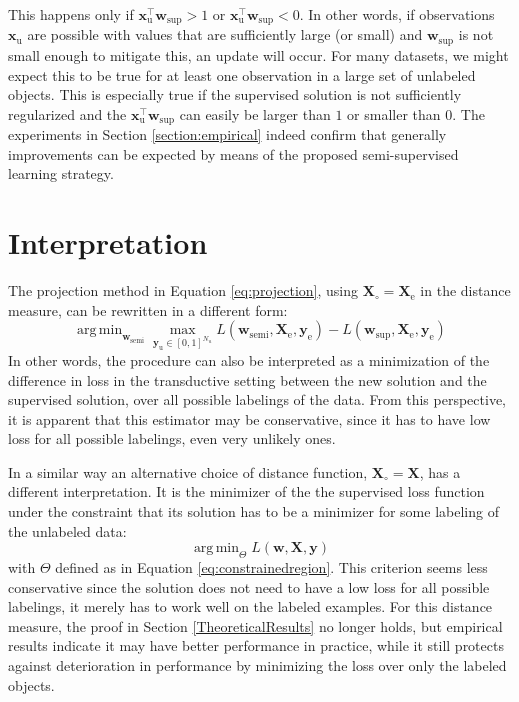 \documentclass{article}
\newcommand{\Xe}{\vec{X}_\mathrm{e}  }
\renewcommand{\vec}[1]{\mathbf{#1}}
\DeclareMathOperator*{\argmin}{arg\,min}
\begin{document}
This happens only if $\vec{x}_\text{u}^\top \vec{w}_\text{sup} > 1$ or $\vec{x}_\text{u}^\top \vec{w}_\text{sup} < 0$. In other words, if observations $\vec{x}_\text{u}$ are possible with values that are sufficiently large (or small) and $\vec{w}_\text{sup}$ is not small enough to mitigate this, an update will occur. For many datasets, we might expect this to be true for at least one observation in a large set of unlabeled objects. This is especially true if the  supervised solution is not sufficiently regularized and the $\vec{x}_\text{u}^\top \vec{w}_\text{sup}$ can easily be larger than $1$ or smaller than $0$. The experiments in Section \ref{section:empirical} indeed confirm that generally improvements can be expected by means of the proposed semi-supervised learning strategy.

\section{Interpretation}
\label{section:interpretations}
The projection method in Equation \eqref{eq:projection}, using $\vec{X}_{\circ}=\Xe$ in the distance measure, can be rewritten in a different form:
\begin{equation}
\argmin_{\vec{w}_\text{semi}} \max_{\vec{y}_\text{u} \in [0,1]^{N_u}} L(\vec{w}_\text{semi},\Xe,\vec{y}_\text{e}) - L(\vec{w}_\text{sup},\Xe,\vec{y}_\text{e})
\end{equation}
In other words, the procedure can also be interpreted as a minimization of the difference in loss in the transductive setting between the new solution and the supervised solution, over all possible labelings of the data. From this perspective, it is apparent that this estimator may be conservative, since it has to have low loss for all possible labelings, even very unlikely ones.

In a similar way an alternative choice of distance function, $\vec{X}_{\circ}=\vec{X}$, has a different interpretation. It is the minimizer of the the supervised loss function under the constraint that its solution has to be a minimizer for some labeling of the unlabeled data:
\begin{equation}
\argmin_{\Theta} L(\vec{w},\vec{X},\vec{y})
\end{equation}
with $\Theta$ defined as in Equation \eqref{eq:constrainedregion}. This criterion seems less conservative since the solution does not need to have a low loss for all possible labelings, it merely has to work well on the labeled examples. For this distance measure, the proof in Section \ref{TheoreticalResults} no longer holds, but empirical results indicate it may have better performance in practice, while it still protects against deterioration in performance by minimizing the loss over only the labeled objects.
\end{document}
